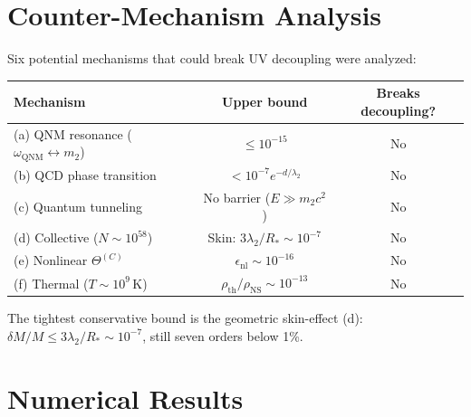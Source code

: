 \documentclass[12pt,a4paper]{article}
\newcommand{\Rstar}{R_*}
\begin{document}
\section{Counter-Mechanism Analysis}
\label{sec:devil}

Six potential mechanisms that could break UV decoupling were analyzed:

\begin{center}
\begin{tabular}{lcc}
\toprule
\textbf{Mechanism} & \textbf{Upper bound} & \textbf{Breaks decoupling?} \\
\midrule
(a) QNM resonance ($\omega_{\mathrm{QNM}} \leftrightarrow m_2$) & $\leq 10^{-15}$ & No \\
(b) QCD phase transition & $< 10^{-7}e^{-d/\lambda_2}$ & No \\
(c) Quantum tunneling & No barrier ($E \gg m_2c^2$) & No \\
(d) Collective ($N \sim 10^{58}$) & Skin: $3\lambda_2/\Rstar \sim 10^{-7}$ & No \\
(e) Nonlinear $\Theta^{(C)}$ & $\epsilon_{\mathrm{nl}} \sim 10^{-16}$ & No \\
(f) Thermal ($T \sim 10^9$\,K) & $\rho_{\mathrm{th}}/\rho_{\mathrm{NS}} \sim 10^{-13}$ & No \\
\bottomrule
\end{tabular}
\end{center}

\noindent
The tightest conservative bound is the geometric skin-effect (d):
$\delta M/M \leq 3\lambda_2/\Rstar \sim 10^{-7}$, still seven orders
below 1\%.

\section{Numerical Results}
\label{sec:numerical}
\end{document}
